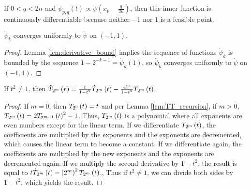 If $0 < q < 2n$ and $\psi_{p,q}\left(t\right) \propto \psi\left(x_p - \frac{q}{2n}\right)$, then this inner function is continuously differentiable because neither $-1$ nor $1$ is a feasible point.

\begin{lemma}[]
  \label{lem:derivative_convergence}
  $\dot{\psi}_k$ converges uniformly to $\dot{\psi}$ on $\left(-1,1\right)$.
\end{lemma}
\begin{proof}
  Lemma \ref{lem:derivative_bound} implies the sequence of functions $\dot{\psi}_k$ is bounded by the sequence $1 - 2^{-k - 1} = \dot{\psi}_k\left(1\right)$, so $\dot{\psi}_k$ converges uniformly to $\dot{\psi}$ on $\left(-1,1\right)$.
\end{proof}

\begin{lemma}
  \label{lem:ODE}
  If $t^2 \neq 1$, then $\ddot{T}_{2^m}\left(r\right) = \frac{t}{1 - t^2} \dot{T}_{2^m}\left(t\right) - \frac{4^m}{1 - t^2} T_{2^{m}}\left(t\right)$.
\end{lemma}
\begin{proof}
  If $m = 0$, then $T_{2^{0}}\left(t\right) = t$ and per Lemma \ref{lem:TT_recursion}, if $m > 0$, $T_{2^{m}}\left(t\right) = 2T_{2^{m - 1}}\left(t\right)^2 - 1$. Thus, $T_{2^{m}}\left(t\right)$ is a polynomial where all exponents are even numbers except for the linear term. If we differentiate $T_{2^{m}}\left(t\right)$, the coefficients are multiplied by the exponents and the exponents are decremented, which causes the linear term to become a constant. If we differentiate again, the coefficients are multiplied by the new exponents and the exponents are decremented again. If we multiply the second derivative by $1 - t^2$, the result is equal to $t \dot{T}_{2^m}\left(t\right) - \left(2^m\right)^2 T_{2^{m}}\left(t\right)$., Thus if $t^2 \neq 1$, we can divide both sides by $1 - t^2$, which yields the result.
\end{proof}

